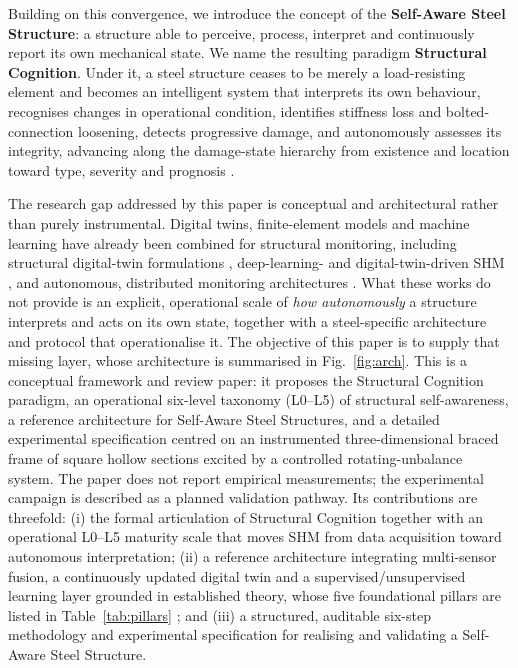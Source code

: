 Building on this convergence, we introduce the concept of the \textbf{Self-Aware Steel Structure}: a structure able to perceive, process, interpret and continuously report its own mechanical state. We name the resulting paradigm \textbf{Structural Cognition}. Under it, a steel structure ceases to be merely a load-resisting element and becomes an intelligent system that interprets its own behaviour, recognises changes in operational condition, identifies stiffness loss and bolted-connection loosening, detects progressive damage, and autonomously assesses its integrity, advancing along the damage-state hierarchy from existence and location toward type, severity and prognosis \citep{farrar2013shm}.

The research gap addressed by this paper is conceptual and architectural rather than purely instrumental. Digital twins, finite-element models and machine learning have already been combined for structural monitoring, including structural digital-twin formulations \citep{chiachio2022structural}, deep-learning- and digital-twin-driven SHM \citep{zou2026deep}, and autonomous, distributed monitoring architectures \citep{li2025edge,mariniello2025enhancing}. What these works do not provide is an explicit, operational scale of \textit{how autonomously} a structure interprets and acts on its own state, together with a steel-specific architecture and protocol that operationalise it. The objective of this paper is to supply that missing layer, whose architecture is summarised in Fig.~\ref{fig:arch}. This is a conceptual framework and review paper: it proposes the Structural Cognition paradigm, an operational six-level taxonomy (L0--L5) of structural self-awareness, a reference architecture for Self-Aware Steel Structures, and a detailed experimental specification centred on an instrumented three-dimensional braced frame of square hollow sections excited by a controlled rotating-unbalance system. The paper does not report empirical measurements; the experimental campaign is described as a planned validation pathway. Its contributions are threefold: (i) the formal articulation of Structural Cognition together with an operational L0--L5 maturity scale that moves SHM from data acquisition toward autonomous interpretation; (ii) a reference architecture integrating multi-sensor fusion, a continuously updated digital twin and a supervised/unsupervised learning layer grounded in established theory, whose five foundational pillars are listed in Table~\ref{tab:pillars} \citep{farrar2013shm,brunton2019data,chopra2017dynamics,naser2023ml,cook2002fea}; and (iii) a structured, auditable six-step methodology and experimental specification for realising and validating a Self-Aware Steel Structure.


